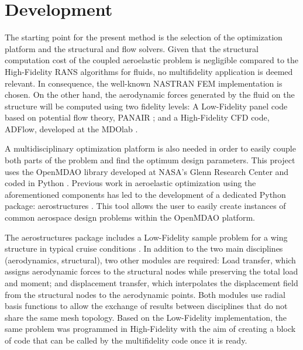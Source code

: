 \section{Development}
\label{sec:development}
The starting point for the present method is the selection of the optimization platform and the structural and flow solvers. Given that the structural computation cost of the coupled aeroelastic problem is negligible compared to the High-Fidelity RANS algorithms for fluids, no multifidelity application is deemed relevant. In consequence, the well-known NASTRAN FEM implementation is chosen. On the other hand, the aerodynamic forces generated by the fluid on the structure will be computed using two fidelity levels: A Low-Fidelity panel code based on potential flow theory, PANAIR \cite{carmichael1981pan}; and a High-Fidelity CFD code, ADFlow, developed at the MDOlab \cite{lyu2013automatic}. \par
A multidisciplinary optimization platform is also needed in order to easily couple both parts of the problem and find the optimum design parameters. This project uses the OpenMDAO library developed at NASA's Glenn Research Center and coded in Python \cite{openmdao_2019}. Previous work in aeroelastic optimization using the aforementioned components has led to the development of a dedicated Python package: aerostructures \cite{mascolomer:tel-02023612}. This tool allows the user to easily create instances of common aerospace design problems within the OpenMDAO platform.\par
The aerostructures package includes a Low-Fidelity sample problem for a wing structure in typical cruise conditions \cite{vassberg2008development}. In addition to the two main disciplines (aerodynamics, structural), two other modules are required:
Load transfer, which assigns aerodynamic forces to the structural nodes while preserving the total load and moment; and displacement transfer, which interpolates the displacement field from the structural nodes to the aerodynamic points. Both modules use radial basis functions to allow the exchange of results between disciplines that do not share the same mesh topology. Based on the Low-Fidelity implementation, the same problem was programmed in High-Fidelity with the aim of creating a block of code that can be called by the multifidelity code once it is ready. 

